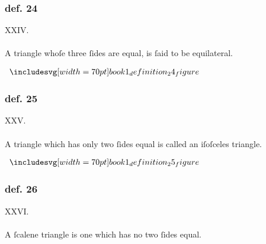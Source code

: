 \hfill

\begin{minipage}{0.67\textwidth}
    \subsubsection{def. 24}
    \begin{center}
        XXIV.\label{book1def24}\\
        \hfill\\
        A triangle whoſe three ſides are equal, is ſaid to be equilateral.
    \end{center}
\end{minipage}%
\begin{minipage}{0.33\textwidth}
    \begin{center}
        $\img[0][0][70]{book1_definition_24_figure}$
    \end{center}
\end{minipage}

\hfill

\begin{minipage}{0.67\textwidth}
    \subsubsection{def. 25}
    \begin{center}
        XXV.\label{book1def25}\\
        \hfill\\
        A triangle which has only two ſides equal is called an iſoſceles \mbox{triangle}.
    \end{center}
\end{minipage}%
\begin{minipage}{0.33\textwidth}
    \begin{center}
        $\img[0][0][70]{book1_definition_25_figure}$
    \end{center}
\end{minipage}

\hfill

\begin{minipage}{0.67\textwidth}
    \subsubsection{def. 26}
    \begin{center}
        XXVI.\label{book1def26}\\
        \hfill\\
        A ſcalene triangle is one which has no two ſides equal.\\
    \end{center}
\end{minipage}%
\begin{minipage}{0.33\textwidth}
    \phantom{}
\end{minipage}

